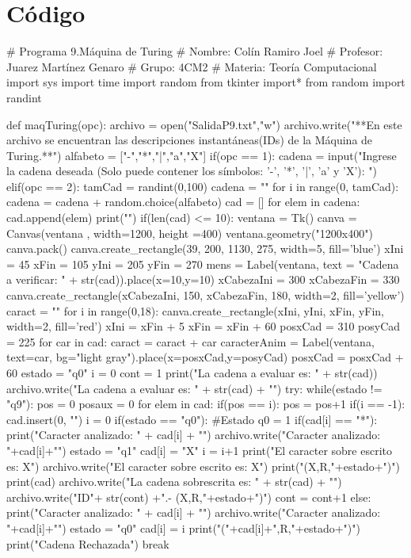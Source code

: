 \documentclass{article}
\begin{document}
	\section*{Código}
	\begin{python}
		# Programa 9.Máquina de Turing
		# Nombre: Colín Ramiro Joel
		# Profesor: Juarez Martínez Genaro
		# Grupo: 4CM2
		# Materia: Teoría Computacional
		import sys
		import time
		import random
		from tkinter import*
		from random import randint
		
		def maqTuring(opc):
			archivo = open("SalidaP9.txt","w")
			archivo.write("**En este archivo se encuentran las descripciones instantáneas(IDs) de la Máquina de Turing.**\n\n")
			alfabeto = ["-","*","|","a","X"]
			if(opc == 1):        
				cadena = input("Ingrese la cadena deseada (Solo puede contener los símbolos: '-', '*', '|', 'a' y 'X'): \n")
			elif(opc == 2):
				tamCad = randint(0,100)
				cadena = ""
				for i in range(0, tamCad):
					cadena = cadena + random.choice(alfabeto)            
			cad = []    
			for elem in cadena:
				cad.append(elem)
			print("\n")
			if(len(cad) <= 10):
				ventana = Tk()
				canva = Canvas(ventana , width=1200, height =400)
				ventana.geometry("1200x400")
				canva.pack()
				canva.create_rectangle(39, 200, 1130, 275, width=5, fill='blue')
				xIni = 45
				xFin = 105
				yIni = 205
				yFin = 270
				mens = Label(ventana, text = "Cadena a verificar: " + str(cad)).place(x=10,y=10)
				xCabezaIni = 300
				xCabezaFin = 330
				canva.create_rectangle(xCabezaIni, 150, xCabezaFin, 180, width=2, fill='yellow')  
				caract = ""
				for i in range(0,18):
					canva.create_rectangle(xIni, yIni, xFin, yFin, width=2, fill='red')
					xIni = xFin + 5
					xFin = xFin + 60   
				posxCad = 310
				posyCad = 225  
				for car in cad:
				caract = caract + car 
					caracterAnim = Label(ventana, text=car, bg="light gray").place(x=posxCad,y=posyCad)
					posxCad = posxCad + 60     
			estado = "q0"
			i = 0 
			cont = 1
			print("La cadena a evaluar es: " + str(cad)) 
			archivo.write("La cadena a evaluar es:   " + str(cad) + "\n\n")
			try:        
				while(estado != "q9"):
					pos = 0
					posaux = 0
					for elem in cad:
						if(pos == i):
							pos = pos+1
					if(i == -1):
						cad.insert(0, "")
						i = 0
					if(estado == "q0"): #Estado q0 = 1
						if(cad[i] == "*"):
							print("Caracter analizado: " + cad[i] + "\n")
							archivo.write("Caracter analizado: "+cad[i]+"\n")
							estado = "q1"
							cad[i] = "X"     
							i = i+1                             
							print("El caracter sobre escrito es: X\n")
							archivo.write("El caracter sobre escrito es: X\n")
							print("(X,R,"+estado+")\n")
							print(cad)
							archivo.write("La cadena sobrescrita es: " + str(cad) + "\n")
							archivo.write("ID"+ str(cont) +".- (X,R,"+estado+")\n\n")
							cont = cont+1
						else:
							print("Caracter analizado: " + cad[i] + "\n")
							archivo.write("Caracter analizado: "+cad[i]+"\n")
							estado = "q0"
							cad[i] = i
							print("("+cad[i]+",R,"+estado+")\n")
							print("Cadena Rechazada")                    
							break
				

\end{python}
\end{document}
